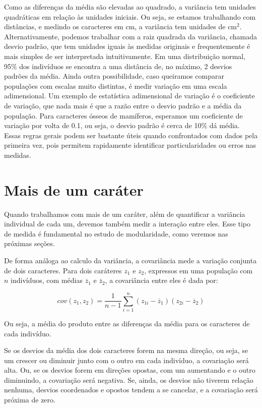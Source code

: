 \documentclass[portuges,]{tufte-handout}
\begin{document}
Como as diferenças da média são elevadas ao quadrado, a variância tem
unidades quadráticas em relação às unidades iniciais. Ou seja, se
estamos trabalhando com distâncias, e medindo os caracteres em cm, a
variância tem unidades de cm\(^2\). Alternativamente, podemos trabalhar
com a raiz quadrada da variância, chamada desvio padrão, que tem
unidades iguais às medidas originais e frequentemente é mais simples de
ser interpretada intuitivamente. Em uma distribuição normal, 95\% dos
indivíduos se encontra a uma distância de, no máximo, 2 desvios padrões
da média. Ainda outra possibilidade, caso queiramos comparar populações
com escalas muito distintas, é medir variação em uma escala
adimensional. Um exemplo de estatística adimensional de variação é o
coeficiente de variação, que nada mais é que a razão entre o desvio
padrão e a média da população. Para caracteres ósseos de mamíferos,
esperamos um coeficiente de variação por volta de 0.1, ou seja, o desvio
padrão é cerca de 10\% dá média. Essas regras gerais podem ser bastante
úteis quando confrontados com dados pela primeira vez, pois permitem
rapidamente identificar particularidades ou erros nas medidas.

\section{Mais de um caráter}\label{mais-de-um-caruxe1ter}

Quando trabalhamos com mais de um caráter, além de quantificar a
variância individual de cada um, devemos também medir a interação entre
eles. Esse tipo de medida é fundamental no estudo de modularidade, como
veremos nas próximas seções.

De forma análoga ao calculo da variância, a covariância mede a variação
conjunta de dois caracteres. Para dois caráteres \(z_1\) e \(z_2\),
expressos em uma população com \(n\) indivíduos, com médias
\(\overline z_1\) e \(\overline z_2\), a covariância entre eles é dada
por:

\[
cov(z_1, z_2) = \frac{1}{n-1} \sum_{i=1}^n (z_{1i} - \overline z_1)(z_{2i} - \overline z_2)
\]

Ou seja, a média do produto entre as diferenças da média para os
caracteres de cada indivíduo.

Se os desvios da média dos dois caracteres forem na mesma direção, ou
seja, se um crescer ou diminuir junto com o outro em cada indivíduo, a
covariação será alta. Ou, se os desvios forem em direções opostas, com
um aumentando e o outro diminuindo, a covariação será negativa. Se,
ainda, os desvios não tiverem relação nenhuma, desvios coordenados e
opostos tendem a se cancelar, e a covariação será próxima de zero.
\end{document}
